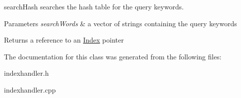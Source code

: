 search\-Hash searches the hash table for the query keywords. 


\begin{DoxyParams}{Parameters}
{\em search\-Words} & a vector of strings containing the query keywords \\
\hline
\end{DoxyParams}
\begin{DoxyReturn}{Returns}
a reference to an \hyperlink{class_index}{Index} pointer 
\end{DoxyReturn}


The documentation for this class was generated from the following files\-:\begin{DoxyCompactItemize}
\item 
indexhandler.\-h\item 
indexhandler.\-cpp\end{DoxyCompactItemize}

